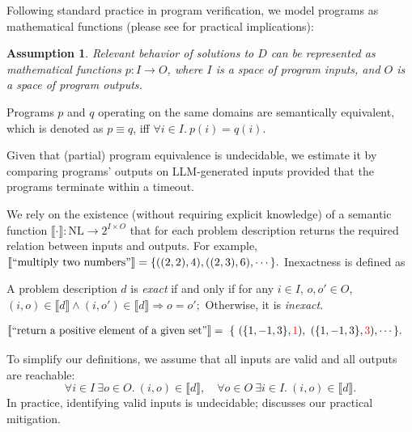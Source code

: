 \documentclass[acmsmall,screen,nonacm]{acmart}
\newtheorem{assumption}{Assumption}
\begin{document}
Following standard practice in program verification, we model programs as mathematical functions (please see  for practical implications):

\begin{assumption}\label{assumption:pure}
  Relevant behavior of solutions to $D$ can be represented as mathematical functions $p: I \rightarrow O$, where $I$ is a space of program inputs, and $O$ is a space of program outputs. 
\end{assumption}

\begin{definition}
  Programs $p$ and $q$ operating on the same domains are semantically equivalent, which is denoted as $p \equiv q$, iff $\forall i\in I.\ p(i) = q(i).$
\end{definition}

\noindent Given that (partial) program equivalence is undecidable, we estimate it by comparing programs' outputs on LLM-generated inputs provided that the programs terminate within a timeout.

We rely on the existence (without requiring explicit knowledge) of a semantic function $\llbracket \cdot \rrbracket : \mathrm{NL} \to 2^{I \times O}$ that for each problem description returns the required relation between inputs and outputs. For example, $\llbracket ``\text{multiply two numbers}" \rrbracket = \{ ((2, 2), 4), ((2, 3), 6), \cdots \}.$ Inexactness is defined as

\begin{definition}[Exactness]\label{def:exact}
  A problem description $d$ is \emph{exact} if and only if for any $i\in I$, $o, o'\in O$, $(i, o) \in \llbracket d \rrbracket \wedge (i, o') \in \llbracket d \rrbracket \Rightarrow o = o';$ Otherwise, it is \emph{inexact}.
\end{definition}

\begin{example}
  \begin{align*}
    \llbracket ``\text{return}\text{ a positive element of a given set}" \rrbracket =\ \{\ &(\{1, -1, 3\}, {\color{red} 1}),\ (\{1, -1, 3\}, {\color{red} 3}), \cdots \}.
  \end{align*}
\end{example}

To simplify our definitions, we assume that all inputs are valid and all outputs are reachable:
\[
\forall i\in I\ \exists o\in O.\ (i, o) \in \llbracket d \rrbracket,\quad \forall o\in O\ \exists i\in I.\ (i, o) \in \llbracket d \rrbracket.
\]
In practice, identifying valid inputs is undecidable;  discusses our practical mitigation.
\end{document}
